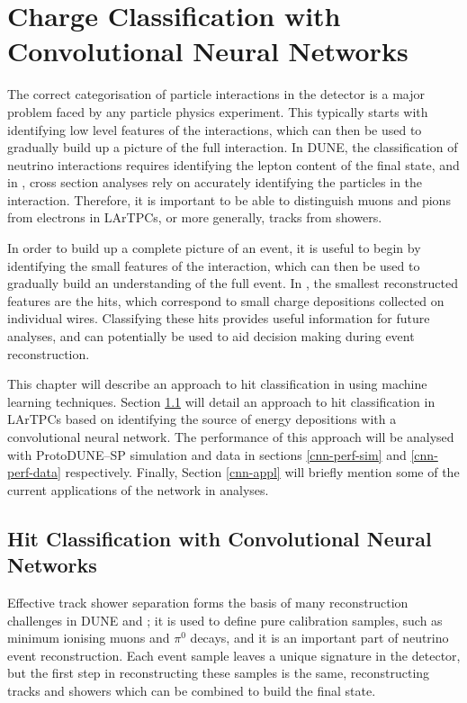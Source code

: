 \chapter{\label{ch:chargeid}Charge Classification with Convolutional Neural 
Networks} 

\minitoc

The correct categorisation of particle interactions in the detector is a major
problem faced by any particle physics experiment. This typically starts with
identifying low level features of the interactions, which can then be used to
gradually build up a picture of the full interaction. In DUNE, the
classification of neutrino interactions requires identifying the lepton content
of the final state, and in \protodune{}, cross section analyses rely on
accurately identifying the particles in the interaction. Therefore, it is
important to be able to distinguish muons and pions from electrons in LArTPCs, 
or more generally, tracks from showers.

In order to build up a complete picture of an event, it is useful to begin by
identifying the small features of the interaction, which can then be used to
gradually build an understanding of the full event. In \protodune{}, the
smallest reconstructed features are the hits, which correspond to small charge 
depositions collected on individual wires. Classifying these hits provides
useful information for future analyses, and can potentially be used to aid
decision making during event reconstruction.

This chapter will describe an approach to hit classification in \protodune{} 
using machine learning techniques. Section \ref{hit-id} will detail an 
approach to hit classification in LArTPCs based on identifying the source of 
energy depositions with a convolutional neural network.  The performance of 
this approach will be analysed with ProtoDUNE--SP simulation and data in 
sections \ref{cnn-perf-sim} and \ref{cnn-perf-data} respectively. Finally,
Section \ref{cnn-appl} will briefly mention some of the current applications of
the network in \protodune{} analyses.

\section{Hit Classification with Convolutional Neural Networks} \label{hit-id}

Effective track shower separation forms the basis of many reconstruction
challenges in DUNE and \protodune{}; it is used to define pure calibration
samples, such as minimum ionising muons and $\pi^0$ decays, and it is an
important part of neutrino event reconstruction. Each event sample leaves a
unique signature in the detector, but the first step in reconstructing these
samples is the same, reconstructing tracks and showers which can be combined to
build the final state. 

